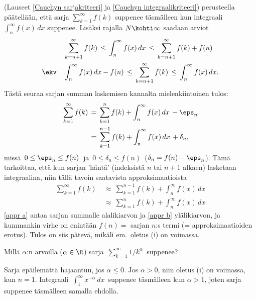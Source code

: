 (Lauseet \ref{Cauchyn sarjakriteeri} ja \ref{Cauchyn integraalikriteeri}) perusteella
päätellään, että sarja $\sum_{k=1}^\infty f(k)$ suppenee täsmälleen kun integraali
$\int_n^\infty f(x)\,dx$ suppenee. Lisäksi rajalla $N\kohti\infty$ saadaan arviot
\begin{align*}
           &\sum_{k=n+1}^\infty f(k) 
              \,\le\, \int_n^\infty f(x)\,dx \,\le\, \sum_{k=n+1}^\infty f(k) + f(n) \\
\ekv \quad &\int_n^\infty f(x)\,dx - f(n) 
              \,\le\, \sum_{k=n+1}^\infty f(k) \,\le\, \int_n^\infty f(x)\,dx.
\end{align*}
Tästä seuraa sarjan summan laskemisen kannalta mielenkiintoinen tulos:
\begin{align*}
\sum_{k=1}^\infty f(k) &\,=\, \sum_{k=1}^{n} f(k) + \int_n^\infty f(x)\,dx\,-\eps_n \\
                      &\,=\, \sum_{k=1}^{n-1} f(k) + \int_n^\infty f(x)\,dx\,+\delta_n,
\end{align*}
missä $\,0 \le \eps_n \le f(n)\,$ ja $\,0 \le \delta_n \le f(n)\,$ ($\delta_n=f(n)-\eps_n$).
Tämä tarkoittaa, että kun sarjan 'häntä' (indeksistä $n$ tai $n+1$ alkaen) lasketaan 
integraalina, niin tällä tavoin saatavista approksimaatioista
\begin{align}
\sum_{k=1}^\infty f(k)\ 
         &\approx\ \sum_{k=1}^{n-1} f(k) + \int_n^\infty f(x)\,dx \label{appr a} \tag{a} \\
         &\approx\ \sum_{k=1}^{n} f(k) + \int_n^\infty f(x)\,dx \label{appr b} \tag{b}
\end{align}
\eqref{appr a} antaa sarjan summalle alalikiarvon ja \eqref{appr b} ylälikiarvon, ja kummankin
virhe on enintään $f(n)=$ sarjan $n$:s termi (= approksimaatioiden erotus). Tulos on siis
pätevä, mikäli em.\ oletus (i) on voimassa.
\begin{Exa} \label{sarja vs integraali}
Millä $\alpha$:n arvoilla ($\alpha\in\R$) sarja $\,\sum_{k=1}^\infty 1/k^\alpha\,$ suppenee?
\end{Exa}
\ratk Sarja epäilemättä hajaantuu, jos $\alpha \le 0$. Jos $\alpha>0$, niin oletus (i) on
voimassa, kun $n=1$. Integraali $\,\int_1^\infty x^{-\alpha}\,dx\,$ suppenee täsmälleen kun
$\alpha>1$, joten sarja suppenee täsmälleen samalla ehdolla. \loppu

